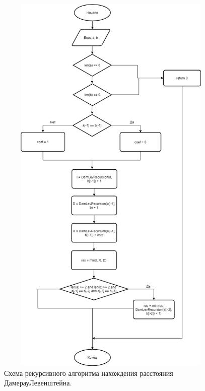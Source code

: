 \documentclass[a4paper,12pt]{article}
\begin{document}
\begin{figure}[H]
	\centering
	\includegraphics[width=12cm, height= 19cm]{damlevrec.png}
	\captionsetup{justification=centering}
	\caption{Схема рекурсивного алгоритма нахождения расстояния ДамерауЛевенштейна.}
	\label{Рис 3}
\end{figure}
\end{document}
